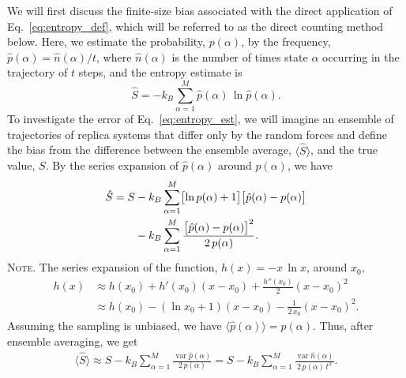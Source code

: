 \documentclass[reprint, superscriptaddress]{revtex4-1}
\newcommand{\note}[1]{{\color{DarkGreen}\footnotesize \textsc{Note.} #1}}
\begin{document}
We will first discuss the finite-size bias associated with
the direct application of Eq.~\eqref{eq:entropy_def},
which will be referred to as the direct counting method below.
%
Here, we estimate the probability, $p(\alpha)$,
by the frequency, $\hat{p}(\alpha) = \hat{n}(\alpha) / t$,
where $\hat{n}(\alpha)$ is the number of times state $\alpha$ occurring in the trajectory of $t$ steps,
and the entropy estimate is
%
\begin{equation}
  \hat S
  =
  -k_B \sum_{\alpha = 1}^M \hat{p}(\alpha) \, \ln \hat{p}(\alpha)
  .
  \label{eq:entropy_est}
\end{equation}
%
To investigate the error of Eq.~\eqref{eq:entropy_est},
we will imagine an ensemble of trajectories of replica systems
that differ only by the random forces
and define the bias from the difference
between the ensemble average,
$\bigl\langle \hat S \bigr\rangle$,
and the true value, $S$.
%
By the series expansion of $\hat{p}(\alpha)$ around $p(\alpha)$, we have
%
\begin{align}
  \hat S
  =
  S
  &- k_B \sum_{\alpha = 1}^M
    \bigl[\ln p(\alpha) + 1 \bigr]
    \bigl[ \hat{p}(\alpha) - p(\alpha) \bigr]
  \notag\\
  &- k_B \sum_{\alpha = 1}^M
    \frac{ \bigl[ \hat{p}(\alpha) - p(\alpha) \bigr]^2 } { 2 \, p(\alpha) }
  .
  \label{eq:Shat_series}
\end{align}
%
\note{The series expansion of the function, $h(x) = -x \, \ln x$,
around $x_0$,
%
\begin{align*}
  h(x)
  &\approx h(x_0) + h'(x_0) (x - x_0) + \frac{h''(x_0)}{2} (x - x_0)^2 \\
  &\approx h(x_0) - (\ln x_0 + 1) ( x - x_0) - \frac{1}{2 \, x_0} (x - x_0)^2
  .
\end{align*}
}
%
Assuming the sampling is unbiased,
we have $\langle \hat{p}(\alpha) \rangle = p(\alpha)$.
%
Thus, after ensemble averaging, we get
%
\begin{align}
  \bigl\langle \hat S \bigr\rangle
  \approx
  S - k_B \sum_{\alpha = 1}^M
    \frac{ \operatorname{var} \hat{p}(\alpha) } { 2 \, p(\alpha) }
  =
  S - k_B \sum_{\alpha = 1}^M
    \frac{ \operatorname{var} \hat{n}(\alpha) } { 2 \, p(\alpha) \, t^2 }
  .
  \label{eq:entest_2nd}
\end{align}
\end{document}
